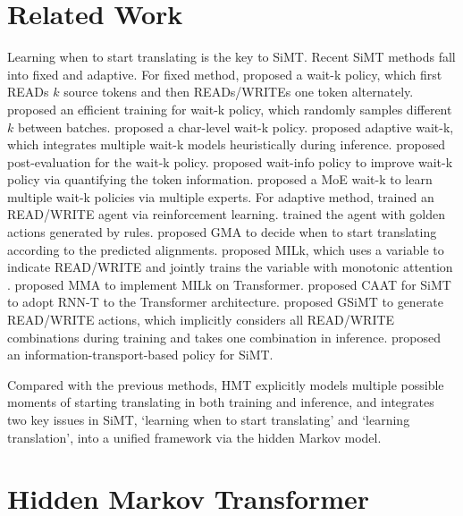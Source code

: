 \documentclass{article} %
\begin{document}
\section{Related Work}
Learning when to start translating is the key to SiMT. Recent SiMT methods fall into fixed and adaptive. For fixed method, \citet {ma-etal-2019-stacl} proposed a wait-k policy, which first READs $k$ source tokens and then READs/WRITEs one token alternately. \citet{multipath} proposed an efficient training for wait-k policy, which randomly samples different $k$ between batches. \citet{zhang-feng-2021-icts} proposed a char-level wait-k policy. \citet{zheng-etal-2020-simultaneous} proposed adaptive wait-k, which integrates multiple wait-k models heuristically during inference. \citet{guo-etal-2022-turning} proposed post-evaluation for the wait-k policy. \citet{zhang-etal-2022-wait} proposed wait-info policy to improve wait-k policy via quantifying the token information. \citet{zhang-feng-2021-universal} proposed a MoE wait-k to learn multiple wait-k policies via multiple experts. For adaptive method, \citet{gu-etal-2017-learning} trained an READ/WRITE agent via reinforcement learning. \citet{Zheng2019b} trained the agent with golden actions generated by rules. \citet{zhang-feng-2022-gaussian} proposed GMA to decide when to start translating according to the predicted alignments. \citet {Arivazhagan2019} proposed MILk, which uses a variable to indicate READ/WRITE and jointly trains the variable with monotonic attention \citep{LinearTime}. \citet{Ma2019a} proposed MMA to implement MILk on Transformer. \citet{liu-etal-2021-cross} proposed CAAT for SiMT to adopt RNN-T to the Transformer architecture. \citet{miao-etal-2021-generative} proposed GSiMT to generate READ/WRITE actions, which implicitly considers all READ/WRITE combinations during training and takes one combination in inference. \citet{zhang-feng-2022-information} proposed an information-transport-based policy for SiMT. 

Compared with the previous methods, HMT explicitly models multiple possible moments of starting translating in both training and inference, and integrates two key issues in SiMT, `learning when to start translating' and `learning translation', into a unified framework via the hidden Markov model.

\section{Hidden Markov Transformer}
\label{sec:stateformer}
\end{document}
